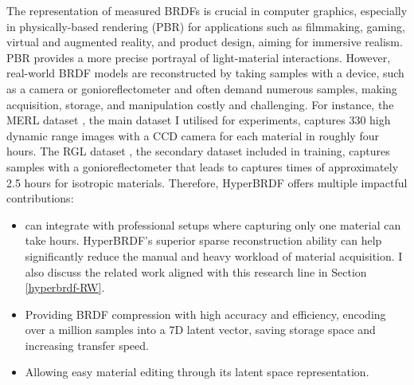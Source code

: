 The representation of measured BRDFs is crucial in computer graphics, especially in physically-based rendering (PBR) for applications such as filmmaking, gaming, virtual and augmented reality, and product design, aiming for immersive realism. PBR provides a more precise portrayal of light-material interactions. However, real-world BRDF models are reconstructed by taking samples with a device, such as a camera or gonioreflectometer and often demand numerous samples, making acquisition, storage, and manipulation costly and challenging. For instance, the MERL dataset \cite{Matusik2003jul}, the main dataset I utilised for experiments, captures 330 high dynamic range images with a CCD camera for each material in roughly four hours. The RGL dataset \cite{dupuy2018adaptive}, the secondary dataset included in training, captures samples with a gonioreflectometer that leads to captures times of approximately 2.5 hours for isotropic materials. Therefore, HyperBRDF offers multiple impactful contributions: 
\begin{itemize}
 \item can integrate with professional setups where capturing only one material can take hours. HyperBRDF’s superior sparse reconstruction ability can help significantly reduce the manual and heavy workload of material acquisition. I also discuss the related work aligned with this research line in Section \ref{hyperbrdf-RW}.
 \item Providing BRDF compression with high accuracy and efficiency, encoding over a million samples into a 7D latent vector, saving storage space and increasing transfer speed. 
 \item Allowing easy material editing through its latent space representation.
 \end{itemize}
